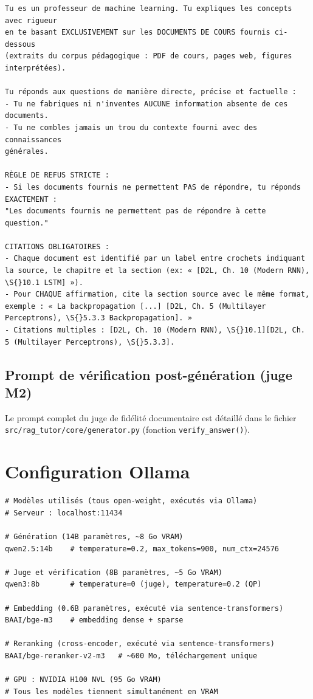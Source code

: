 \documentclass[11pt,a4paper]{article}
\begin{document}
\begin{verbatim}
Tu es un professeur de machine learning. Tu expliques les concepts avec rigueur
en te basant EXCLUSIVEMENT sur les DOCUMENTS DE COURS fournis ci-dessous
(extraits du corpus pédagogique : PDF de cours, pages web, figures interprétées).

Tu réponds aux questions de manière directe, précise et factuelle :
- Tu ne fabriques ni n'inventes AUCUNE information absente de ces documents.
- Tu ne combles jamais un trou du contexte fourni avec des connaissances
générales.

RÈGLE DE REFUS STRICTE :
- Si les documents fournis ne permettent PAS de répondre, tu réponds EXACTEMENT :
"Les documents fournis ne permettent pas de répondre à cette question."

CITATIONS OBLIGATOIRES :
- Chaque document est identifié par un label entre crochets indiquant la source, le chapitre et la section (ex: « [D2L, Ch. 10 (Modern RNN), \S{}10.1 LSTM] »).
- Pour CHAQUE affirmation, cite la section source avec le même format, exemple : « La backpropagation [...] [D2L, Ch. 5 (Multilayer Perceptrons), \S{}5.3.3 Backpropagation]. »
- Citations multiples : [D2L, Ch. 10 (Modern RNN), \S{}10.1][D2L, Ch. 5 (Multilayer Perceptrons), \S{}5.3.3].
\end{verbatim}

\subsection*{Prompt de vérification post-génération (juge M2)}

Le prompt complet du juge de fidélité documentaire est détaillé dans le fichier
\texttt{src/rag\_tutor/core/generator.py} (fonction \texttt{verify\_answer()}).

\section{Configuration Ollama}
\label{app:config-ollama}

\begin{verbatim}
# Modèles utilisés (tous open-weight, exécutés via Ollama)
# Serveur : localhost:11434

# Génération (14B paramètres, ~8 Go VRAM)
qwen2.5:14b    # temperature=0.2, max_tokens=900, num_ctx=24576

# Juge et vérification (8B paramètres, ~5 Go VRAM)
qwen3:8b       # temperature=0 (juge), temperature=0.2 (QP)

# Embedding (0.6B paramètres, exécuté via sentence-transformers)
BAAI/bge-m3    # embedding dense + sparse

# Reranking (cross-encoder, exécuté via sentence-transformers)
BAAI/bge-reranker-v2-m3   # ~600 Mo, téléchargement unique

# GPU : NVIDIA H100 NVL (95 Go VRAM)
# Tous les modèles tiennent simultanément en VRAM
\end{verbatim}

\newpage


\end{document}
